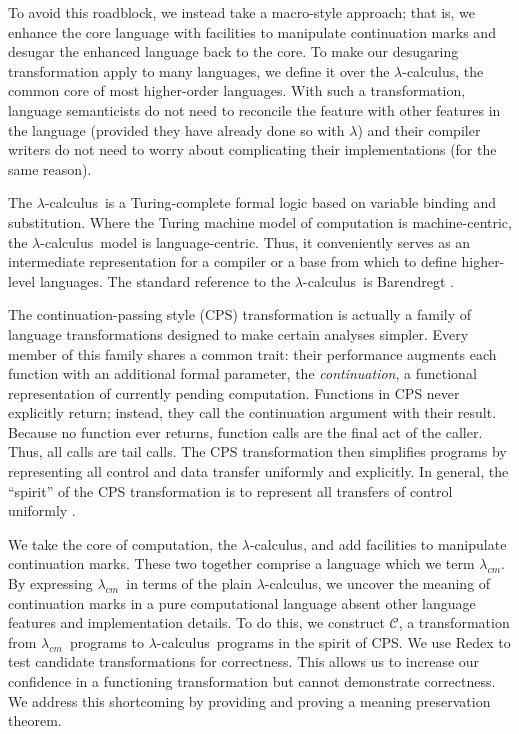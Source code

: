 \documentclass[ms,electronic,twosidetoc,letterpaper,chaptercenter,parttop]{byumsphd}
\newcommand{\lc}{$\lambda$-calculus}
\newcommand{\cm}{$\lambda_{cm}$}
\begin{document}
To avoid this roadblock, we instead take a macro-style approach; that is, we enhance the core language with facilities to manipulate continuation marks and desugar the enhanced language back to the core. To make our desugaring transformation apply to many languages, we define it over the \lc, the common core of most higher-order languages. With such a transformation, language semanticists do not need to reconcile the feature with other features in the language (provided they have already done so with $\lambda$) and their compiler writers do not need to worry about complicating their implementations (for the same reason).

The \lc\ is a Turing-complete formal logic based on variable binding and substitution.
Where the Turing machine model of computation is machine-centric, the \lc\ model is
language-centric. Thus, it conveniently serves as an intermediate representation for a
compiler or a base from which to define higher-level languages. The standard
reference to the \lc\ is Barendregt \cite{barendregt1984lambda}.

The continuation-passing style (CPS) transformation is actually a family of
language transformations designed to make certain analyses simpler. Every member of this family
shares a common trait: their performance augments each function with an additional formal
parameter, the \emph{continuation}, a functional representation of currently pending
computation. Functions in CPS never explicitly return; instead, they call the continuation
argument with their result. Because no function ever returns, function calls are the final
act of the caller. Thus, all calls are tail calls. The CPS transformation then simplifies
programs by representing all control and data transfer uniformly and explicitly. In
general, the ``spirit'' of the CPS transformation is to represent all transfers of control
uniformly \cite{sabry1994formal}.

We take the core of computation, the \lc, and add facilities to manipulate continuation
marks. These two together comprise a language which we term \cm. By expressing \cm\ in
terms of the plain \lc, we uncover the meaning of continuation marks in a pure
computational language absent other language features and implementation details. To do
this, we construct $\mathcal{C}$, a transformation from \cm\ programs to \lc\ programs in
the spirit of CPS. We use Redex \cite{findler2010redex} to test candidate transformations
for correctness. This allows us to increase our confidence in a functioning transformation
but cannot demonstrate correctness. We address this shortcoming by providing and proving a
meaning preservation theorem.
\end{document}
